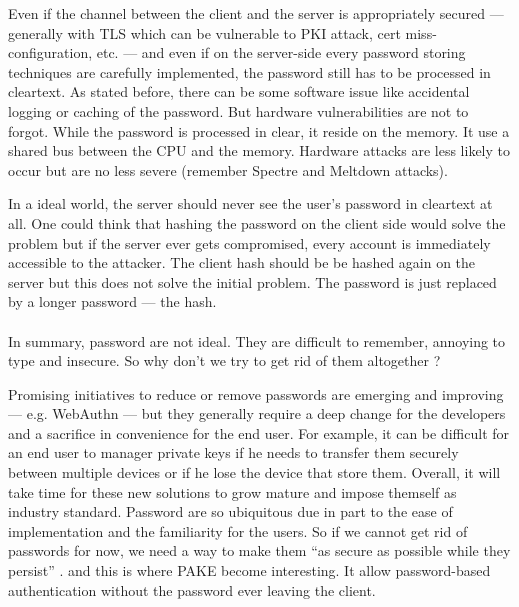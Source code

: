 \documentclass[../report.tex]{subfiles}
\begin{document}
Even if the channel between the client and the server is appropriately secured
--- generally with TLS which can be vulnerable to PKI attack, cert miss-configuration, etc. ---
and even if on the server-side every password storing techniques are carefully implemented, the password still has to be processed in cleartext.
As stated before, there can be some software issue like accidental logging or caching of the password. But hardware vulnerabilities are not to forgot. While the password is processed in clear, it reside on the memory. It use a shared bus between the CPU and the memory. Hardware attacks are less likely to occur but are no less severe (remember Spectre \cite{Spectre_Paper} and Meltdown \cite{Meltdown_Paper} attacks).

In a ideal world, the server should never see the user's password in cleartext at all.
One could think that hashing the password on the client side would solve the problem but if the server ever gets compromised, every account is immediately accessible to the attacker. The client hash should be be hashed again on the server but this does not solve the initial problem. The password is just replaced by a longer password --- the hash.

\paragraph{}

In summary, password are not ideal. They are difficult to remember, annoying to type and insecure.
So why don't we try to get rid of them altogether ?

Promising initiatives to reduce or remove passwords are emerging and improving --- e.g. WebAuthn ---
but they generally require a deep change for the developers and a sacrifice in convenience for the end user.
For example, it can be difficult for an end user to manager private keys if he needs to transfer them securely between multiple devices or if he lose the device that store them.
Overall, it will take time for these new solutions to grow mature and impose themself as industry standard.
Password are so ubiquitous due in part to the ease of implementation and the familiarity for the users.
So if we cannot get rid of passwords for now, we need a way to make them ``as secure as possible while they persist'' \cite{PAKE_Cloudflare_blog}.
and this is where PAKE become interesting. It allow password-based authentication without the password ever leaving the client.
\end{document}
